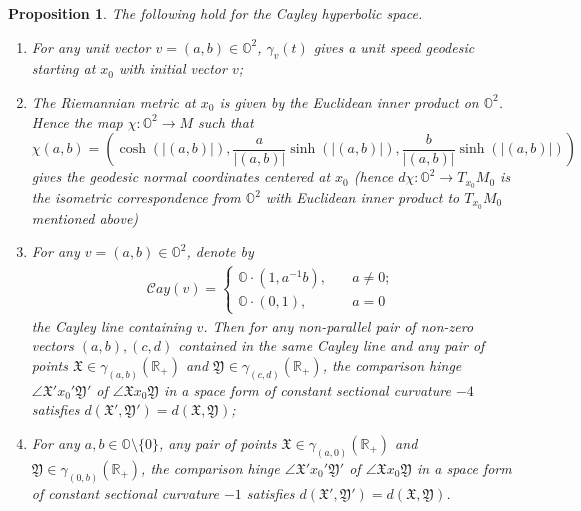 \documentclass{article}
\newcommand{\OO}{\mathbb{O}}
\newcommand{\RR}{\mathbb{R}}
\newcommand{\Cay}{\mathcal{C}ay}
\newcommand{\FFX}{\mathfrak{X}}
\newcommand{\FFY}{\mathfrak{Y}}
\newtheorem{prop}[thm]{Proposition}
\theoremstyle{definition}
\begin{document}
\begin{prop}
The following hold for the Cayley hyperbolic space.
\begin{enumerate}\label{curv_OH^2}
\item[(1).] For any unit vector $v=(a,b)\in\OO^2$, $\gamma_v(t)$ gives a unit speed geodesic starting at $x_0$ with initial vector $v$; 
\item[(2).] The Riemannian metric at $x_0$ is given by the Euclidean inner product on $\OO^2$. Hence the map $\chi:\OO^2\to M$ such that
$$\chi(a,b)=\left(\cosh(|(a,b)|),\frac{a}{|(a,b)|}\sinh(|(a,b)|),\frac{b}{|(a,b)|}\sinh(|(a,b)|)\right)$$
gives the geodesic normal coordinates centered at $x_0$ (hence $d\chi:\OO^2\to T_{x_0}M_0$ is the isometric correspondence from $\OO^2$ with Euclidean inner product to $T_{x_0}M_0$ mentioned above)
\item[(3).] For any $v=(a,b)\in\OO^2$, denote by 
\begin{align*}
\Cay(v)=\begin{cases}
\displaystyle \OO\cdot(1,a^{-1}b),\quad& a\neq0; \\
\displaystyle \OO\cdot(0,1),&a=0
\end{cases}
\end{align*}
the \emph{Cayley line} containing $v$. Then for any non-parallel pair of non-zero vectors $(a,b),(c,d)$ contained in the same Cayley line and any pair of points $\FFX\in\gamma_{(a,b)}(\RR_+)$ and $\FFY\in\gamma_{(c,d)}(\RR_+)$, the comparison hinge $\angle \FFX' x_0'\FFY'$ of $\angle \FFX x_0\FFY$ in a space form of constant sectional curvature $-4$ satisfies $d(\FFX',\FFY')=d(\FFX,\FFY)$;
\item[(4).] For any $a,b\in\OO\setminus\{0\}$, any pair of points $\FFX\in\gamma_{(a,0)}(\RR_+)$ and $\FFY\in\gamma_{(0,b)}(\RR_+)$, the comparison hinge $\angle \FFX' x_0'\FFY'$ of $\angle \FFX x_0\FFY$ in a space form of constant sectional curvature $-1$ satisfies $d(\FFX',\FFY')=d(\FFX,\FFY)$.
\end{enumerate}
\end{prop}
\end{document}
